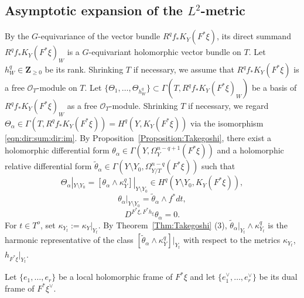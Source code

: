 \documentclass[amscd, leqno]{amsart}
\theoremstyle{plain}
\theoremstyle{definition}
\theoremstyle{remark}
\begin{document}
\subsection
{Asymptotic expansion of the $L^{2}$-metric}
\label{sect:4.4}
\par
By the $G$-equivariance of the vector bundle $R^{q}f_{*}K_{Y}(F^{*}\xi)$, 
its direct summand $R^{q}f_{*}K_{Y}(F^{*}\xi)_{W}$ is a $G$-equivariant holomorphic vector bundle on $T$. 
Let $h_{W}^{q} \in{\mathbf Z}_{\geq0}$ be its rank. Shrinking $T$ if necessary, we assume that $R^{q}f_{*}K_{Y}(F^{*}\xi)$ is a free
${\mathcal O}_{T}$-module on $T$. 
Let $\{\Theta_{1},\ldots,\Theta_{h_{W}^{q}}\} \subset \Gamma(T, R^{q}f_{*}K_{Y}(F^{*}\xi)_{W})$ be a basis of 
$R^{q}f_{*}K_{Y}(F^{*}\xi)_{W}$ as a free ${\mathcal O}_{T}$-module. 
Shrinking $T$ if necessary, we regard $\Theta_{\alpha} \in \Gamma(T, R^{q}f_{*}K_{Y}(F^{*}\xi)) = H^{q}(Y, K_{Y}(F^{*}\xi))$ 
via the isomorphism \eqref{eqn:dir:sum:dir:im}.
By Proposition~\ref{Proposition:Takegoshi}, there exist a holomorphic differential form 
$\theta_{\alpha} \in \Gamma(Y,\Omega_{Y}^{n-q+1}(F^{*}\xi))$ 
and a holomorphic relative differential form $\widetilde{\theta}_{\alpha} \in \Gamma(Y\setminus Y_{0},\Omega_{Y/T}^{n-q}(F^{*}\xi))$ 
such that
\begin{equation}
\label{eqn:theta:1}
\Theta_{\alpha}|_{Y\setminus Y_{0}}=[\theta_{\alpha}\wedge\kappa_{Y}^{q}]|_{Y\setminus Y_{0}} \in H^{q}(Y\setminus Y_{0}, K_{Y}(F^{*}\xi)),
\end{equation}
\begin{equation}
\label{eqn:theta:2}
\theta_{\alpha}|_{Y\setminus Y_{0}} = \widetilde{\theta}_{\alpha}\wedge f^{*}dt,
\end{equation}
\begin{equation}
\label{eqn:flatness}
D^{F^{*}\xi, F^{*}h_{\xi}} \theta_{\alpha} =0.
\end{equation}
For $t\in T^{o}$, set $\kappa_{Y_{t}}:=\kappa_{Y}|_{Y_{t}}$. 
By Theorem~\ref{Thm:Takegoshi} (3), $\widetilde{\theta}_{\alpha}|_{Y_{t}}\wedge\kappa_{Y_{t}}^{q}$ is the harmonic representative of 
the class $[\widetilde{\theta}_{\alpha}\wedge\kappa_{Y}^{q}]|_{Y_{t}}$ with respect to the metrics $\kappa_{Y_{t}}$, $h_{F^{*}\xi}|_{Y_{t}}$. 
\par
Let $\{e_{1},\ldots,e_{r}\}$ be a local holomorphic frame of $F^{*}\xi$ and 
let $\{e_{1}^{\lor},\ldots,e_{r}^{\lor}\}$ be its dual frame of $F^{*}\xi^{\lor}$. 
\end{document}

